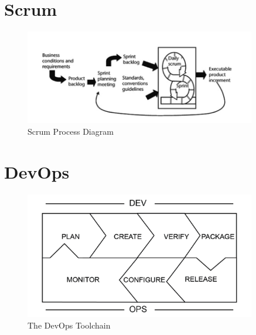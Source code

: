 \chapter{Scrum}\label{appendix:scrum}
\begin{figure}[h!]
    \centering
    \includegraphics[width=0.9\textwidth]{images/scrum.png}
    \caption{Scrum Process Diagram}
    \label{image:scrum}
\end{figure}

\chapter{DevOps}\label{appendix:devops}
\begin{figure}[h!]
    \centering
    \includegraphics[width=0.9\textwidth]{images/devops.png}
    \caption{The DevOps Toolchain}
    \label{image:devops}
\end{figure}